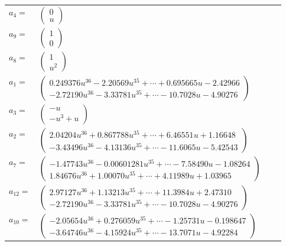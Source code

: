 \documentclass[1p]{elsarticle_modified}
\theoremstyle{definition}
\begin{document}
\begin{tabular}{m{7pt} m{180pt} m{7pt} m{180pt} }
\flushright $a_{4}=$&$\begin{pmatrix}0\\u\end{pmatrix}$ \\
\flushright $a_{9}=$&$\begin{pmatrix}1\\0\end{pmatrix}$ \\
\flushright $a_{8}=$&$\begin{pmatrix}1\\u^2\end{pmatrix}$ \\
\flushright $a_{1}=$&$\begin{pmatrix}0.249376 u^{36}-2.20569 u^{35}+\cdots+0.695665 u-2.42966\\-2.72190 u^{36}-3.33781 u^{35}+\cdots-10.7028 u-4.90276\end{pmatrix}$ \\
\flushright $a_{3}=$&$\begin{pmatrix}- u\\- u^3+u\end{pmatrix}$ \\
\flushright $a_{2}=$&$\begin{pmatrix}2.04204 u^{36}+0.867788 u^{35}+\cdots+6.46551 u+1.16648\\-3.43496 u^{36}-4.13136 u^{35}+\cdots-11.6065 u-5.42543\end{pmatrix}$ \\
\flushright $a_{7}=$&$\begin{pmatrix}-1.47743 u^{36}-0.00601281 u^{35}+\cdots-7.58490 u-1.08264\\1.84676 u^{36}+1.00070 u^{35}+\cdots+4.11989 u+1.03965\end{pmatrix}$ \\
\flushright $a_{12}=$&$\begin{pmatrix}2.97127 u^{36}+1.13213 u^{35}+\cdots+11.3984 u+2.47310\\-2.72190 u^{36}-3.33781 u^{35}+\cdots-10.7028 u-4.90276\end{pmatrix}$ \\
\flushright $a_{10}=$&$\begin{pmatrix}-2.05654 u^{36}+0.276059 u^{35}+\cdots-1.25731 u-0.198647\\-3.64746 u^{36}-4.15924 u^{35}+\cdots-13.7071 u-4.92284\end{pmatrix}$ \\

\end{tabular}
\end{document}
